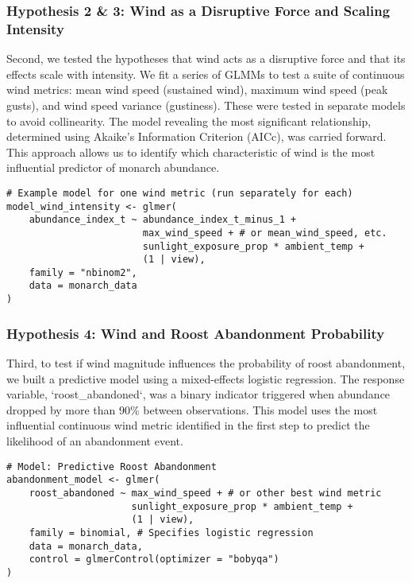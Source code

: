 \subsubsection{Hypothesis 2 & 3: Wind as a Disruptive Force and Scaling Intensity}

Second, we tested the hypotheses that wind acts as a disruptive force and that its effects scale with intensity. We fit a series of GLMMs to test a suite of continuous wind metrics: mean wind speed (sustained wind), maximum wind speed (peak gusts), and wind speed variance (gustiness). These were tested in separate models to avoid collinearity. The model revealing the most significant relationship, determined using Akaike’s Information Criterion (AICc), was carried forward. This approach allows us to identify which characteristic of wind is the most influential predictor of monarch abundance.

\begin{verbatim}
# Example model for one wind metric (run separately for each)
model_wind_intensity <- glmer(
    abundance_index_t ~ abundance_index_t_minus_1 + 
                        max_wind_speed + # or mean_wind_speed, etc.
                        sunlight_exposure_prop * ambient_temp +
                        (1 | view),
    family = "nbinom2",
    data = monarch_data
)
\end{verbatim}

\subsubsection{Hypothesis 4: Wind and Roost Abandonment Probability}

Third, to test if wind magnitude influences the probability of roost abandonment, we built a predictive model using a mixed-effects logistic regression. The response variable, `roost_abandoned`, was a binary indicator triggered when abundance dropped by more than 90\% between observations. This model uses the most influential continuous wind metric identified in the first step to predict the likelihood of an abandonment event.

\begin{verbatim}
# Model: Predictive Roost Abandonment
abandonment_model <- glmer(
    roost_abandoned ~ max_wind_speed + # or other best wind metric
                      sunlight_exposure_prop * ambient_temp +
                      (1 | view),
    family = binomial, # Specifies logistic regression
    data = monarch_data,
    control = glmerControl(optimizer = "bobyqa")
)
\end{verbatim}

